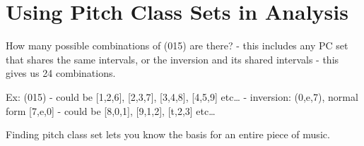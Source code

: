 \documentclass{book}
\begin{document}
\hypertarget{using-pitch-class-sets-in-analysis}{%
\section{Using Pitch Class Sets in
Analysis}\label{using-pitch-class-sets-in-analysis}}

How many possible combinations of (015) are there? - this includes any PC set
that shares the same intervals, or the inversion and its shared intervals -
this gives us 24 combinations.

Ex: (015) - could be {[}1,2,6{]}, {[}2,3,7{]}, {[}3,4,8{]}, {[}4,5,9{]}
etc\ldots{} - inversion: (0,e,7), normal form {[}7,e,0{]} - could be
{[}8,0,1{]}, {[}9,1,2{]}, {[}t,2,3{]} etc\ldots{}

Finding pitch class set lets you know the basis for an entire piece of music.

\backmatter
\end{document}
